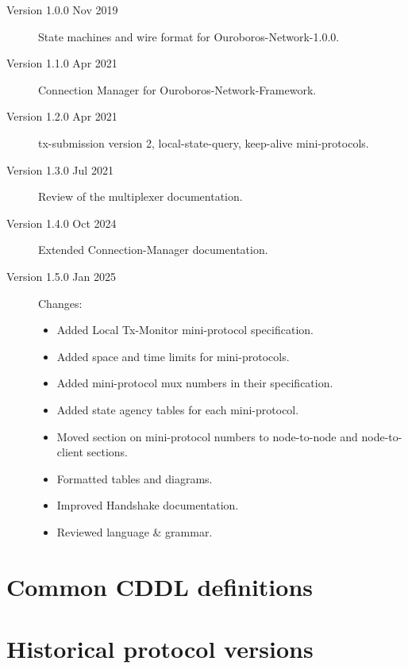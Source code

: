 \documentclass{report}
\begin{document}
\begin{description}
\item[Version 1.0.0 Nov 2019] State machines and wire format for Ouroboros-Network-1.0.0.
\item[Version 1.1.0 Apr 2021] Connection Manager for Ouroboros-Network-Framework.
\item[Version 1.2.0 Apr 2021] tx-submission version 2, local-state-query, keep-alive mini-protocols.
\item[Version 1.3.0 Jul 2021] Review of the multiplexer documentation.
\item[Version 1.4.0 Oct 2024] Extended Connection-Manager documentation.
\item[Version 1.5.0 Jan 2025] Changes:
  \begin{itemize}
    \item Added Local Tx-Monitor mini-protocol specification.
    \item Added space and time limits for mini-protocols.
    \item Added mini-protocol mux numbers in their specification.
    \item Added state agency tables for each mini-protocol.
    \item Moved section on mini-protocol numbers to node-to-node and node-to-client sections.
    \item Formatted tables and diagrams.
    \item Improved Handshake documentation.
    \item Reviewed language \& grammar.
  \end{itemize}
\end{description}
\listoftodos
\pagebreak

% 




% 

\appendix

\chapter{Common CDDL definitions}
\label{cddl-common}


\chapter{Historical protocol versions}
\label{historical-protocol-versions}
\end{document}
